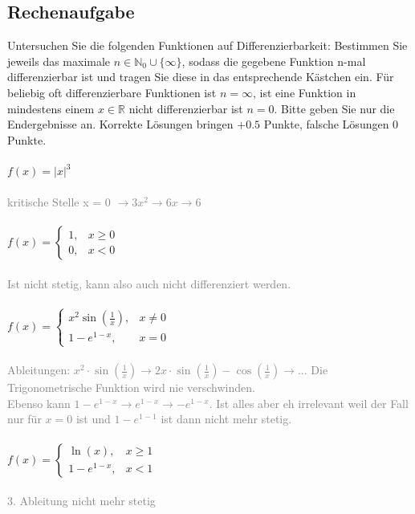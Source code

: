 \documentclass[a4paper]{article}
\begin{document}
\subsection{Rechenaufgabe}
Untersuchen Sie die folgenden Funktionen auf Differenzierbarkeit: Bestimmen Sie jeweils das maximale $n \in \mathbb{N}_0 \cup\{\infty\}$, sodass die gegebene Funktion n-mal differenzierbar ist und tragen Sie diese in das entsprechende Kästchen ein. Für beliebig oft differenzierbare Funktionen ist $n = \infty$, ist eine Funktion in mindestens einem $x \in \mathbb{R}$ nicht differenzierbar ist $n = 0$. Bitte geben Sie nur die Endergebnisse an. Korrekte Lösungen bringen $+0.5$ Punkte, falsche Lösungen 0 Punkte.\\\\
\(f(x) = \left| x \right|^3\)\\\\
\fbox{\parbox{\linewidth}{
\[f \text{ ist n} = 3\text{-mal differenzierbar}\]
}}\vspace*{2mm}
\textcolor{gray}{kritische Stelle x = 0 $\rightarrow 3x^2 \rightarrow 6x \rightarrow 6$}\\\\
\(f(x) =
\begin{cases}
1, & x \geq 0 \\
0, & x < 0
\end{cases}
\)\\\\
\fbox{\parbox{\linewidth}{
\[f \text{ ist n} = \text{0-mal differenzierbar}\]
}}\vspace*{2mm}
\textcolor{gray}{Ist nicht stetig, kann also auch nicht differenziert werden.}\\\\
\(f(x) =
\begin{cases}
x^2 \sin(\frac{1}{x}), & x \neq 0 \\
1 - e^{1 - x}, & x = 0
\end{cases}
\)\\\\
\fbox{\parbox{\linewidth}{
\[f \text{ ist n} = 0\text{-mal differenzierbar}\]
}}\vspace*{2mm}
\textcolor{gray}{Ableitungen: $x^2 \cdot \sin(\frac{1}{x}) \rightarrow 2x \cdot \sin(\frac{1}{x}) -\cos(\frac{1}{x}) \rightarrow ...$ Die Trigonometrische Funktion wird nie verschwinden.\\Ebenso kann $1-e^{1 - x} \rightarrow e^{1 - x} \rightarrow -e^{1 - x}$. Ist alles aber eh irrelevant weil der Fall nur für $x = 0$ ist und $1 - e^{1 - 1}$ ist dann nicht mehr stetig.}\\\\
\(f(x) =
\begin{cases}
\ln(x), & x \geq 1 \\
1 - e^{1 - x}, & x < 1
\end{cases}
\)\\\\
\fbox{\parbox{\linewidth}{
\[f \text{ ist n} = 2\text{-mal differenzierbar}\]
}}\vspace*{2mm}
\textcolor{gray}{3. Ableitung nicht mehr stetig}\\
\end{document}
